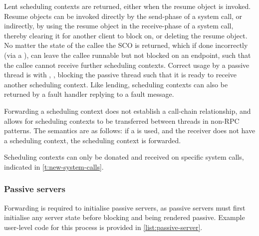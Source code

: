 Lent scheduling contexts are returned, either when the resume object is invoked. Resume objects 
can be invoked directly by the send-phase of a system call, or indirectly, by using the
resume object in the receive-phase of a system call, thereby clearing it for another client to block
on, or deleting the resume object.
No matter the state of the callee the \gls{SCO} is returned, which if done
incorrectly (via a \send), can leave the callee runnable but not blocked on an endpoint, such that 
the callee cannot receive further scheduling contexts. Correct usage by a passive thread is with \replyrecv,
\nbsendrecv, blocking the passive thread such that it is ready to receive another scheduling
context. Like lending, scheduling contexts can also be returned by a fault handler replying to a fault message.

Forwarding a scheduling context does not establish a call-chain relationship, and allows
for scheduling contexts to be transferred between threads in non-RPC patterns. The semantics are
as follows: if a \nbsendrecv is used, and the receiver does not have a scheduling context,
the scheduling context is forwarded. 

Scheduling contexts can only be donated and received on specific system calls, indicated in
\cref{t:new-system-calls}. 

\subsubsection{Passive servers}
\label{sec:impl-passive-servers}

Forwarding is required to initialise passive servers, as passive servers must first initialise any 
server state before blocking and being rendered passive. Example user-level code for this process is 
provided in \cref{list:passive-server}. 

